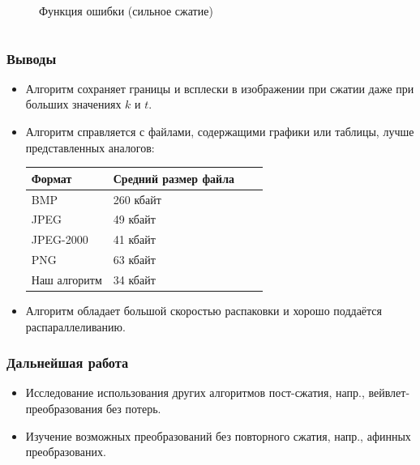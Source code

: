 \documentclass{beamer}
\begin{document}
\begin{frame}
\begin{columns}
\begin{column}{0.45\textwidth}
\begin{figure}
      \caption{Функция ошибки (сильное сжатие)}
    \end{figure}
  \end{column}
\end{columns}

\end{frame}

\begin{frame}
\frametitle{Выводы}

\begin{itemize}
\item Алгоритм сохраняет границы и всплески в изображении при сжатии даже при
  больших значениях $k$ и $t$.
\item Алгоритм справляется с файлами, содержащими графики или таблицы, лучше
  представленных аналогов:
  \begin{center}
    \begin{tabu} {|l|l|l|l|}
      \hline
      Формат & Средний размер файла \\
      \hline
      BMP & 260 кбайт \\
      JPEG & 49 кбайт \\
      JPEG-2000 & 41 кбайт \\
      PNG & 63 кбайт \\
      Наш алгоритм & 34 кбайт \\
      \hline
    \end{tabu}
  \end{center}
\item Алгоритм обладает большой скоростью распаковки и хорошо поддаётся
  распараллеливанию.
\end{itemize}

\end{frame}

\begin{frame}
\frametitle{Дальнейшая работа}

\begin{itemize}
\item Исследование использования других алгоритмов пост-сжатия, напр.,
  вейвлет-преобразования без потерь.
\item Изучение возможных преобразований без повторного сжатия, напр., афинных
  преобразованих.
\end{itemize}

\end{frame}
\end{document}
